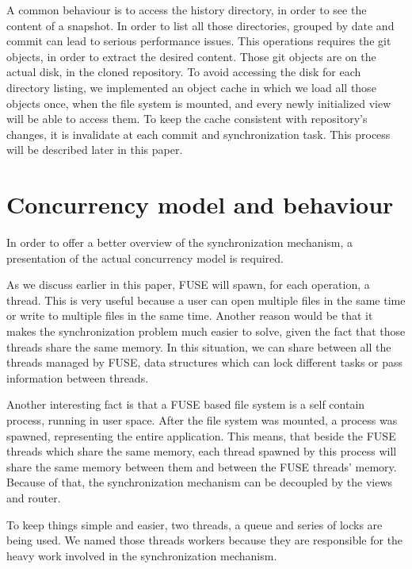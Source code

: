 A common behaviour is to access the history directory, in order to see the content of a snapshot. In order to list all those directories, grouped by date and commit can lead to serious performance issues. This operations requires the git objects, in order to extract the desired content. Those git objects are on the actual disk, in the cloned repository. To avoid accessing the disk for each directory listing, we implemented an object cache in which we load all those objects once, when the file system is mounted, and every newly initialized view will be able to access them. To keep the cache consistent with repository's changes, it is invalidate at each commit and synchronization task. This process will be described later in this paper.

\section{Concurrency model and behaviour}
In order to offer a better overview of the synchronization mechanism, a presentation of the actual concurrency model is required.

As we discuss earlier in this paper, FUSE will spawn, for each operation, a thread. This is very useful because a user can open multiple files in the same time or write to multiple files in the same time. Another reason would be that it makes the synchronization problem much easier to solve, given the fact that those threads share the same memory. In this situation, we can share between all the threads managed by FUSE, data structures which can lock different tasks or pass information between threads.

Another interesting fact is that a FUSE based file system is a self contain process, running in user space. After the file system was mounted, a process was spawned, representing the entire application. This means, that beside the FUSE threads which share the same memory, each thread spawned by this process will share the same memory between them and between the FUSE threads' memory. Because of that, the synchronization mechanism can be decoupled by the views and router.

To keep things simple and easier, two threads, a queue and series of locks are being used. We named those threads workers because they are responsible for the heavy work involved in the synchronization mechanism.

